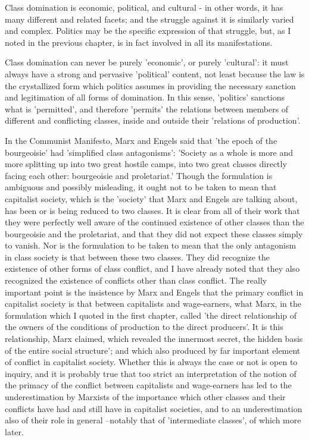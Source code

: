 Class domination is economic, political, and cultural - in other words, it has many different and related facets; and the struggle against it is similarly varied and complex. Politics may be the specific expression of that struggle, but, as I noted in the previous chapter, is in fact involved in all its manifestations.

Class domination can never be purely 'economic', or purely 'cultural': it must always have a strong and pervasive 'political' content, not least because the law is the crystallized form which politics assumes in providing the necessary sanction and legitimation of all forms of domination. In this sense, 'politics' sanctions what is 'permitted', and therefore 'permits' the relations between members of different and conflicting classes, inside and outside their 'relations of production'.

In the Communist Manifesto, Marx and Engels said that 'the epoch of the bourgeoisie' had 'simplified class antagonisms': 'Society as a whole is more and more splitting up into two great hostile camps, into two great classes directly facing each other: bourgeoisie and proletariat.' Though the formulation is ambiguous and possibly misleading, it ought not to be taken to mean that capitalist society, which is the 'society' that Marx and Engels are talking about, has been or is being reduced to two classes. It is clear from all of their work that they were perfectly well aware of the continued existence of other classes than the bourgeoisie and the proletariat, and that they did not expect these classes simply to vanish. Nor is the formulation to be taken to mean that the only antagonism in class society is that between these two classes. They did recognize the existence of other forms of class conflict, and I have already noted that they also recognized the existence of conflicts other than class conflict. The really important point is the insistence by Marx and Engels that the primary conflict in capitalist society is that between capitalists and wage-earners, what Marx, in the formulation which I quoted in the first chapter, called 'the direct relationship of the owners of the conditions of production to the direct producers'. It is this relationship, Marx claimed, which revealed the innermost secret, the hidden basis of the entire social structure'; and which also produced by far important element of conflict in capitalist society. Whether this is always the case or not is open to inquiry, and it is probably true that too strict an interpretation of the notion of the primacy of the conflict between capitalists and wage-earners has led to the underestimation by Marxists of the importance which other classes and their conflicts have had and still have in capitalist societies, and to an underestimation also of their role in general --notably that of 'intermediate classes', of which more later.

